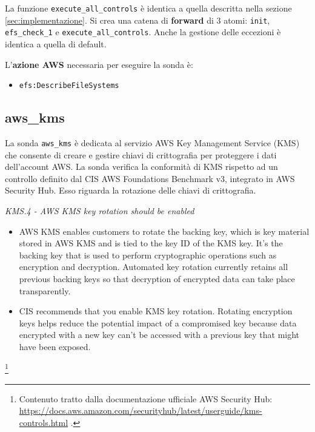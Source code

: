 La funzione \texttt{execute\_all\_controls} è identica a quella descritta nella sezione \ref{sec:implementazione}. Si crea una catena di \textbf{forward} di 3 atomi: \texttt{init}, \texttt{efs\_check\_1} e \texttt{execute\_all\_controls}. Anche la gestione delle eccezioni è identica a quella di default.

\vspace{1em}

\noindent L'\textbf{azione AWS} necessaria per eseguire la sonda è:
\begin{itemize}
    \item \texttt{efs:DescribeFileSystems}
\end{itemize}

\subsection{aws\_kms}
\label{sec:kms}

La sonda \texttt{aws\_kms} è dedicata al servizio AWS Key Management Service (KMS) che consente di creare e gestire chiavi di crittografia per proteggere i dati dell'account AWS. La sonda verifica la conformità di KMS rispetto ad un controllo definito dal CIS AWS Foundations Benchmark v3, integrato in AWS Security Hub. Esso riguarda la rotazione delle chiavi di crittografia. 

\begin{mdframed}[backgroundcolor=gray!05, linecolor=gray!50]
\itshape
KMS.4 - AWS KMS key rotation should be enabled 
\begin{itemize}
    \item AWS KMS enables customers to rotate the backing key, which is key material stored in AWS KMS and is tied to the key ID of the KMS key. It's the backing key that is used to perform cryptographic operations such as encryption and decryption. Automated key rotation currently retains all previous backing keys so that decryption of encrypted data can take place transparently.
    \item CIS recommends that you enable KMS key rotation. Rotating encryption keys helps reduce the potential impact of a compromised key because data encrypted with a new key can't be accessed with a previous key that might have been exposed.
\end{itemize}
\end{mdframed}
\footnote{Contenuto tratto dalla documentazione ufficiale AWS Security Hub: \url{https://docs.aws.amazon.com/securityhub/latest/userguide/kms-controls.html} .}


